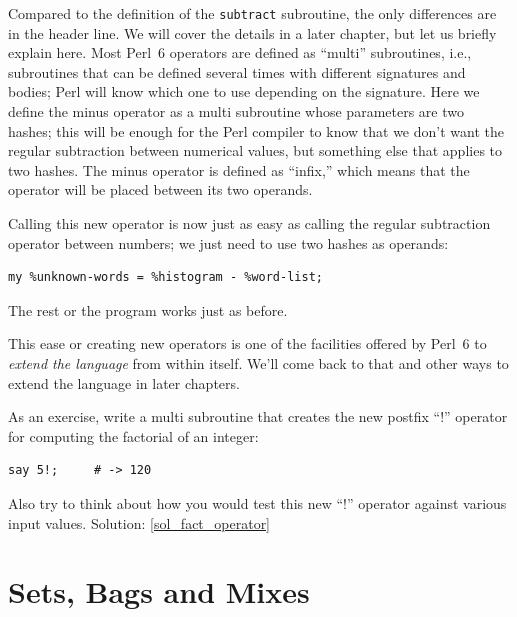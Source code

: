 
Compared to the definition of the {\tt subtract} subroutine, the 
only differences are in the header line. We will cover the 
details in a later chapter, but let us briefly explain here.
Most Perl~6 operators are defined as ``multi'' subroutines, 
i.e., subroutines that can be defined several times with 
different signatures and bodies; Perl will know which one to use depending 
on the signature. Here we define the minus operator as a 
multi subroutine whose parameters are two hashes; this will be 
enough for the Perl compiler to know that we don't want 
the regular subtraction between numerical values, but something 
else that applies to two hashes. The minus operator is defined as 
``infix,'' which means that the operator will be placed 
between its two operands.

Calling this new operator is now just as easy as calling 
the regular subtraction operator between numbers; we just need 
to use two hashes as operands:

\begin{verbatim}
my %unknown-words = %histogram - %word-list;
\end{verbatim}

The rest or the program works just as before.

This ease or creating new operators is one of the facilities 
offered by Perl~6 to \emph{extend the language} from within itself. 
We'll come back to that and other ways to extend the language 
in later chapters.

\label{fact_operator}
As an exercise, write a multi subroutine that creates the new 
postfix ``!'' operator for computing the factorial of an integer:

\begin{verbatim}
say 5!;     # -> 120
\end{verbatim}
%
Also try to think about how you would test this new ``!'' operator 
against various input values.
Solution: \ref{sol_fact_operator}


\section{Sets, Bags and Mixes}
\label{sets_and_bags}


